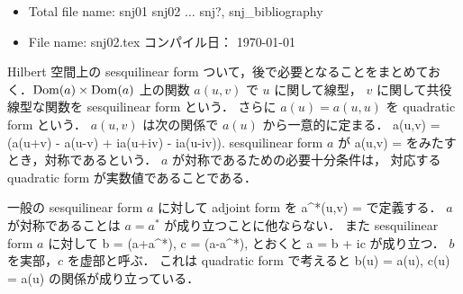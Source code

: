 %
\hide
\vspace{-4mm}
\begin{itemize} \itemsep=-2mm \parsep=0mm
\item Total file name: snj01 snj02 $\dots $ snj?, snj\_bibliography
\item File name: snj02.tex \hfill コンパイル日： \today \ \now
\end{itemize}
\endhide


Hilbert 空間上の sesquilinear form ついて，後で必要となることをまとめておく．$\operatorname{Dom}\nolimits(a)\times\operatorname{Dom}\nolimits(a)$ 上の関数 $a(u,v)$ で $u$ に関して線型，
$v$ に関して共役線型な関数を sesquilinear form という．
さらに $a(u)=a(u,u)$ を quadratic form という．
$a(u,v)$ は次の関係で $a(u)$ から一意的に定まる．
\bdn %
a(u,v)
= (a(u+v) - a(u-v) + ia(u+iv) - ia(u-iv)).
\edn %
sesquilinear form $a$ が
\bdm %
a(u,v) = 
\edm %
をみたすとき，対称であるという．
$a$ が対称であるための必要十分条件は，
対応する quadratic form が実数値であることである．

一般の sesquilinear form $a$ に対して adjoint form を
\bdn %
a^*(u,v)
= 
\edn %
で定義する．
$a$ が対称であることは $a=a^*$ が成り立つことに他ならない．
また sesquilinear form $a$ に対して
\bdn %
b
= (a+a^*), \quad
c
= (a-a^*),
\edn %
とおくと
\bdn %
a
= b + ic
\edn %
が成り立つ．
$b$ を実部，$c$ を虚部と呼ぶ．
これは quadratic form で考えると
\bdn %
b(u)
= \Re a(u), \quad
c(u)
= \Im a(u)
\edn %
の関係が成り立っている．

